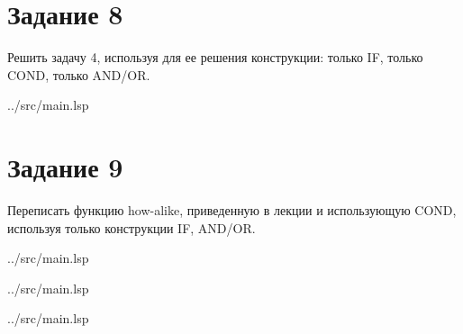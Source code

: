 \section*{Задание 8}

Решить задачу 4, используя для ее решения конструкции: только IF, только COND, только AND/OR.

\begin{lstinputlisting}[
	caption={Задание 8},
	label={lst:t8},
	linerange={111-134},
	]{../src/main.lsp}
\end{lstinputlisting}

\section*{Задание 9}

Переписать функцию how-alike, приведенную в лекции и использующую COND, используя только конструкции IF, AND/OR.

\begin{lstinputlisting}[
	label={lst:t9-1},
	linerange={153-159},
	]{../src/main.lsp}
\end{lstinputlisting}

\begin{lstinputlisting}[
	caption={Задание 9 (Начало)},
	label={lst:t9-2},
	linerange={161-180},
	]{../src/main.lsp}
\end{lstinputlisting}

\begin{lstinputlisting}[
	caption={Задание 9 (Продолжение)},
	label={lst:t9-3},
	linerange={181-188},
	]{../src/main.lsp}
\end{lstinputlisting}
